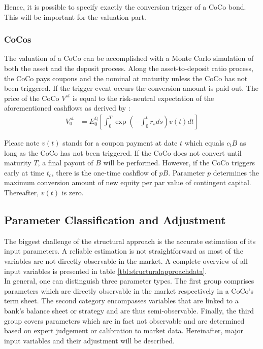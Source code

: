 Hence, it is possible to specify exactly the conversion trigger of a CoCo bond. This will be important for the valuation part.

\subsubsection*{CoCos}
The valuation of a CoCo can be accomplished with a Monte Carlo simulation of both the asset and the deposit process. Along the asset-to-deposit ratio process, the CoCo pays coupons and the nominal at maturity unless the CoCo has not been triggered. If the trigger event occurs the conversion amount is paid out. \citep{wilkens2014contingent} The price of the CoCo $V^{st}$ is equal to the risk-neutral expectation of the aforementioned cashflows as derived by \citet{pennacchi2010structural}:
\begin{align}
V_0^{st} &= E_0^{\mathbb{Q}} \left[ \int_0^T \exp\left(-\int_0^t r_s ds\right) v\left( t \right) dt \right]
\end{align}

Please note $v(t)$ stands for a coupon payment at date $t$ which equals $c_t B$ as long as the CoCo has not been triggered. If the CoCo does not convert until maturity $T$, a final payout of $B$ will be performed. However, if the CoCo triggers early at time $t_c$, there is the one-time cashflow of $pB$. Parameter $p$ determines the maximum conversion amount of new equity per par value of contingent capital. Thereafter, $v(t)$ is zero.

\subsection{Parameter Classification and Adjustment}
The biggest challenge of the structural approach is the accurate estimation of its input parameters. A reliable estimation is not straightforward as most of the variables are not directly observable in the market. \citep{de2014handbook} A complete overview of all input variables is presented in table \ref{tbl:structuralapproachdata}.\\ 

In general, one can distinguish three parameter types. The first group comprises parameters which are directly observable in the market respectively in a CoCo's term sheet. The second category encompasses variables that are linked to a bank's balance sheet or strategy and are thus semi-observable. Finally, the third group covers parameters which are in fact not observable and are determined based on expert judgement or calibration to market data. \citep{wilkens2014contingent} Hereinafter, major input variables and their adjustment will be described.

